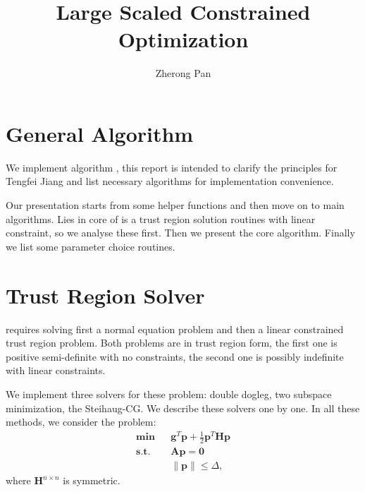 \documentclass[annual]{acmsiggraph}
\title{Large Scaled Constrained Optimization}
\author{Zherong Pan}
\newcommand{\E}[1]{\mathbf{#1}}
\begin{document}
\maketitle

\section{General Algorithm}
We implement algorithm \cite{byrd2000trust}, this report is intended to clarify the principles for Tengfei Jiang and list necessary algorithms for implementation convenience. 

Our presentation starts from some helper functions and then move on to main algorithms. Lies in core of \cite{byrd2000trust} is a trust region solution routines with linear constraint, so we analyse these first. Then we present the core algorithm. Finally we list some parameter choice routines.

\section{Trust Region Solver}
\cite{byrd2000trust} requires solving first a normal equation problem and then a linear constrained trust region problem. Both problems are in trust region form, the first one is positive semi-definite with no constraints, the second one is possibly indefinite with linear constraints.

We implement three solvers for these problem: double dogleg, two subspace minimization, the Steihaug-CG. We describe these solvers one by one. In all these methods, we consider the problem:
\begin{subequations}
\label{pb:TR_PROB}
\begin{align}
\E{min}&&\E{g}^T\E{p}+\frac{1}{2}\E{p}^T\E{H}\E{p}	\\
\E{s.t.}&&\E{A}\E{p}=\E{0}	\\
&&\|\E{p}\|\leq\Delta,
\end{align}
\end{subequations}
where $\E{H}^{n\times n}$ is symmetric.
\end{document}
